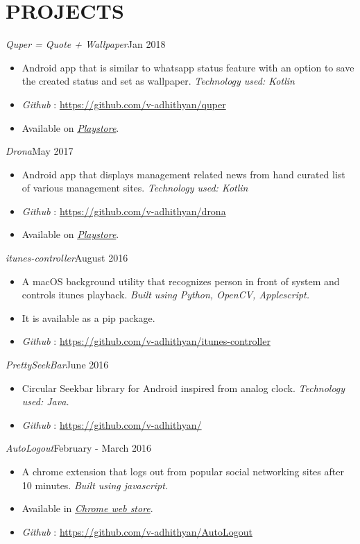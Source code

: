 \documentclass[11pt,a4paper]{article}
\begin{document}
\section*{PROJECTS}
\emph{Quper = Quote + Wallpaper}{\hfill Jan 2018}
\begin{itemize}[noitemsep]
\item Android app that is similar to whatsapp status feature with an option to save the created status and set as wallpaper. \emph{Technology used: Kotlin}
\item \emph{Github} : \href{https://github.com/v-adhithyan/quper}{https://github.com/v-adhithyan/quper}
\item Available on \href{https://play.google.com/store/apps/details?id=ceg.avtechlabs.quper}{\emph{Playstore}}.
\end{itemize}
\emph{Drona}{\hfill May 2017}
\begin{itemize}[noitemsep]
\item Android app that displays management related news from hand curated list of various management sites. \emph{Technology used: Kotlin}
\item \emph{Github} : \href{https://github.com/v-adhithyan/drona}{https://github.com/v-adhithyan/drona}
\item Available on \href{https://play.google.com/store/apps/details?id=ceg.avtechlabs.mba}{\emph{Playstore}}.
\end{itemize}
\emph{itunes-controller}{\hfill August 2016}
\begin{itemize}[noitemsep]
\item A macOS background utility that recognizes person in front of system and controls itunes playback. \emph{Built using
Python, OpenCV, Applescript.}
\item It is available as a pip package.
\item \emph{Github} : \href{https://github.com/v-adhithyan/itunes-controller}{https://github.com/v-adhithyan/itunes-controller}
\end{itemize}
\emph{PrettySeekBar}{\hfill June 2016}
\begin{itemize}[noitemsep]
\item Circular Seekbar library for Android inspired from analog clock. \emph{Technology used: Java.}
\item \emph{Github} : \href{https://github.com/v-adhithyan/PrettySeekBar}{https://github.com/v-adhithyan/}
\end{itemize}
\emph{AutoLogout}{\hfill February - March 2016}
\begin{itemize}[noitemsep]
\item A chrome extension that logs out from popular social networking sites after 10 minutes. \emph{Built using javascript.}
\item Available in \href{https://chrome.google.com/webstore/detail/auto-logout/affkccgnaoeohjnojjnpdalhpjhdiebh?hl=en}{\emph{Chrome web store}}.
\item \emph{Github} : \href{https://github.com/v-adhithyan/AutoLogout}{https://github.com/v-adhithyan/AutoLogout}
\end{itemize}
\end{document}
